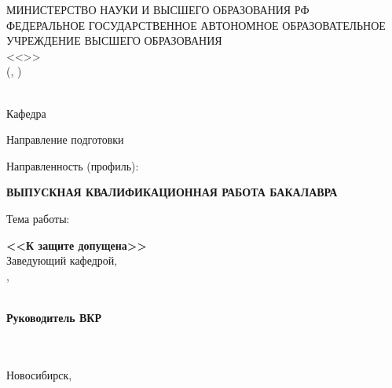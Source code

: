 \begin{titlepage}
    \newpage
    \setlength{\baselineskip}{5mm}

    \begin{center}
        МИНИСТЕРСТВО НАУКИ И ВЫСШЕГО ОБРАЗОВАНИЯ РФ \\
        ФЕДЕРАЛЬНОЕ ГОСУДАРСТВЕННОЕ АВТОНОМНОЕ ОБРАЗОВАТЕЛЬНОЕ УЧРЕЖДЕНИЕ ВЫСШЕГО ОБРАЗОВАНИЯ \\
        \hspace{-0.5mm}<<\MakeUppercase{\universitylongsplit}>> \\
        (\MakeUppercase{\university}, \universityshort)
    \end{center}

    \begin{center}
        \faculty \\
        Кафедра \uline{\makebox[3.8cm][l]{\department}}
    \end{center}

    Направление подготовки \programnum\thinspace{\programname}

    Направленность (профиль): \thinspace{\specialization}
    \vspace{15mm}

    \begin{center}
        \hspace{7mm}\textbf{ВЫПУСКНАЯ КВАЛИФИКАЦИОННАЯ РАБОТА БАКАЛАВРА} \\
        \textbf{\studentfortitle}
    \end{center}

    Тема работы:

    \vspace{5mm}
    \noindent\hspace*{1.3cm}
    \begin{minipage}{\dimexpr\textwidth-2.6cm}
        \setlength{\baselineskip}{5mm}
        \centering
        \MakeUppercase{\textbf{\topic}}
    \end{minipage}
    \vspace{15mm}

    \begin{minipage}[b]{0.35\textwidth}
        \textbf{<<К защите допущена>>} \\
        Заведующий кафедрой, \\
        \apdegree, \aprank \\
        \apinfotemplate \\
        \datetemplate
    \end{minipage}
    \hspace{20mm}
    \begin{minipage}[b]{0.35\textwidth}
        \textbf{Руководитель ВКР} \\
        \sadegree \\
        \sainfotemplate \\
        \datetemplate
    \end{minipage}

    \begin{center}
        \vfill
        Новосибирск, \currentyear
    \end{center}

\end{titlepage}
